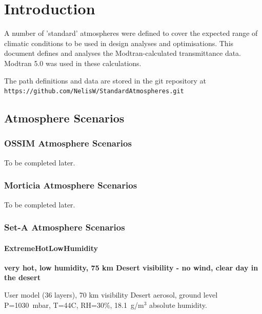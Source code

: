 \documentclass{workpackage}
\begin{document}
\WPlayout
\tableofcontents

\chapter{Introduction}

A number of 'standard' atmospheres were defined to cover the expected range of climatic conditions to be used in design analyses and optimisations.  This document defines and analyses the Modtran-calculated transmittance data.  Modtran 5.0 was used in these calculations.

The path definitions and data are stored in the git repository at\\
\verb+https://github.com/NelisW/StandardAtmospheres.git+


\section{Atmosphere Scenarios}
\label{sec:AtmosphereScenarios}


\subsection{OSSIM Atmosphere Scenarios}
\label{sec:OSSIMAtmosphereScenarios}

To be completed later.

\subsection{Morticia Atmosphere Scenarios}
\label{sec:MorticiaAtmosphereScenarios}

To be completed later.

\subsection{Set-A Atmosphere Scenarios}
\label{sec:SetAAtmosphereScenarios}


\subsubsection{ExtremeHotLowHumidity}
\label{sec:ExtremeHotLowHumidity}

\textbf{very hot, low humidity, 75 km Desert visibility - no wind, clear day in the desert}

User model (36 layers), 70 km visibility  Desert aerosol, ground level P=1030~mbar, T=44C, RH=30\%, 18.1~g/m$^3$  absolute humidity.
\end{document}
